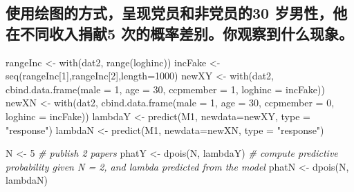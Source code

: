 \documentclass[
]{ctexart}
\newenvironment{Shaded}{\begin{snugshade}}{\end{snugshade}}
\newcommand{\AttributeTok}[1]{\textcolor[rgb]{0.77,0.63,0.00}{#1}}
\newcommand{\CommentTok}[1]{\textcolor[rgb]{0.56,0.35,0.01}{\textit{#1}}}
\newcommand{\DecValTok}[1]{\textcolor[rgb]{0.00,0.00,0.81}{#1}}
\newcommand{\FunctionTok}[1]{\textcolor[rgb]{0.00,0.00,0.00}{#1}}
\newcommand{\NormalTok}[1]{#1}
\newcommand{\OtherTok}[1]{\textcolor[rgb]{0.56,0.35,0.01}{#1}}
\newcommand{\StringTok}[1]{\textcolor[rgb]{0.31,0.60,0.02}{#1}}
\begin{document}
\hypertarget{ux4f7fux7528ux7ed8ux56feux7684ux65b9ux5f0fux5448ux73b0ux515aux5458ux548cux975eux515aux5458ux768430-ux5c81ux7537ux6027ux4ed6ux5728ux4e0dux540cux6536ux5165ux6350ux732e5-ux6b21ux7684ux6982ux7387ux5deeux522bux4f60ux89c2ux5bdfux5230ux4ec0ux4e48ux73b0ux8c61}{%
\subsection{使用绘图的方式，呈现党员和非党员的30
岁男性，他在不同收入捐献5
次的概率差别。你观察到什么现象。}\label{ux4f7fux7528ux7ed8ux56feux7684ux65b9ux5f0fux5448ux73b0ux515aux5458ux548cux975eux515aux5458ux768430-ux5c81ux7537ux6027ux4ed6ux5728ux4e0dux540cux6536ux5165ux6350ux732e5-ux6b21ux7684ux6982ux7387ux5deeux522bux4f60ux89c2ux5bdfux5230ux4ec0ux4e48ux73b0ux8c61}}

\begin{Shaded}
\begin{Highlighting}[]
\NormalTok{rangeInc }\OtherTok{\textless{}{-}} \FunctionTok{with}\NormalTok{(dat2, }\FunctionTok{range}\NormalTok{(loghinc))}
\NormalTok{incFake }\OtherTok{\textless{}{-}} \FunctionTok{seq}\NormalTok{(rangeInc[}\DecValTok{1}\NormalTok{],rangeInc[}\DecValTok{2}\NormalTok{],}\AttributeTok{length=}\DecValTok{1000}\NormalTok{)}
\NormalTok{newXY }\OtherTok{\textless{}{-}} \FunctionTok{with}\NormalTok{(dat2, }\FunctionTok{cbind.data.frame}\NormalTok{(}\AttributeTok{male =} \DecValTok{1}\NormalTok{, }\AttributeTok{age =} \DecValTok{30}\NormalTok{, }\AttributeTok{ccpmember =} \DecValTok{1}\NormalTok{, }\AttributeTok{loghinc =}\NormalTok{ incFake))}
\NormalTok{newXN }\OtherTok{\textless{}{-}} \FunctionTok{with}\NormalTok{(dat2, }\FunctionTok{cbind.data.frame}\NormalTok{(}\AttributeTok{male =} \DecValTok{1}\NormalTok{, }\AttributeTok{age =} \DecValTok{30}\NormalTok{, }\AttributeTok{ccpmember =} \DecValTok{0}\NormalTok{, }\AttributeTok{loghinc =}\NormalTok{ incFake))}
\NormalTok{lambdaY }\OtherTok{\textless{}{-}} \FunctionTok{predict}\NormalTok{(M1, }\AttributeTok{newdata=}\NormalTok{newXY, }\AttributeTok{type =} \StringTok{"response"}\NormalTok{)}
\NormalTok{lambdaN }\OtherTok{\textless{}{-}} \FunctionTok{predict}\NormalTok{(M1, }\AttributeTok{newdata=}\NormalTok{newXN, }\AttributeTok{type =} \StringTok{"response"}\NormalTok{)}

\NormalTok{N }\OtherTok{\textless{}{-}} \DecValTok{5} \CommentTok{\# publish 2 papers}
\NormalTok{phatY }\OtherTok{\textless{}{-}} \FunctionTok{dpois}\NormalTok{(N, lambdaY) }\CommentTok{\# compute predictive probability given N = 2, and lambda predicted from the model}
\NormalTok{phatN }\OtherTok{\textless{}{-}} \FunctionTok{dpois}\NormalTok{(N, lambdaN)}


\end{Highlighting}
\end{Shaded}
\end{document}
